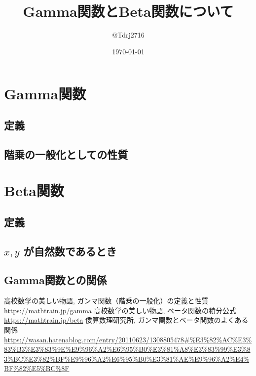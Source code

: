 \documentclass[a4paper,12pt,uplatex,dvipdfmx]{jsarticle}
\begin{document}
\title{Gamma関数とBeta関数について}
\author{@Tdrj2716}
\date{\today}
\maketitle

\section{Gamma関数}
\subsection{定義}

\subsection{階乗の一般化としての性質}

\section{Beta関数}
\subsection{定義}
\subsection{$x, y$ が自然数であるとき}
\subsection{Gamma関数との関係}

\begin{thebibliography}{9}
    高校数学の美しい物語, ガンマ関数（階乗の一般化）の定義と性質 \\
    \url{https://mathtrain.jp/gamma}
    高校数学の美しい物語, ベータ関数の積分公式 \\
    \url{https://mathtrain.jp/beta}
    倭算数理研究所, ガンマ関数とベータ関数のよくある関係 \\
    \url{https://wasan.hatenablog.com/entry/20110623/1308805478#%E3%82%AC%E3%83%B3%E3%83%9E%E9%96%A2%E6%95%B0%E3%81%A8%E3%83%99%E3%83%BC%E3%82%BF%E9%96%A2%E6%95%B0%E3%81%AE%E9%96%A2%E4%BF%82%E5%BC%8F}
\end{thebibliography}
\end{document}
